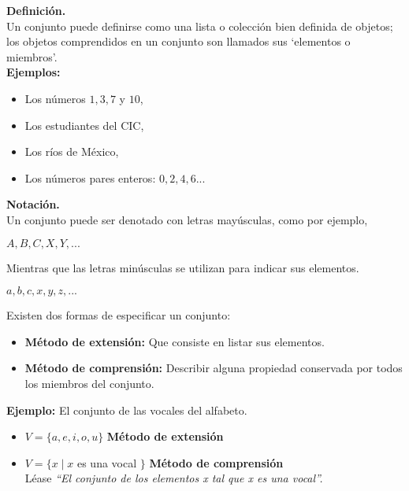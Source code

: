 \noindent \textbf{Definici\'on.} \\
    Un conjunto puede definirse como una lista o colección bien definida de objetos; los objetos comprendidos en un conjunto son llamados sus ‘elementos o miembros’. \\

\noindent    \textbf{Ejemplos:}
    \begin{itemize}
        \item Los n\'umeros $1, 3, 7$ y $10$,
        \item Los estudiantes del CIC, 
        \item Los r\'ios de M\'exico,
        \item Los n\'umeros pares enteros: $0, 2, 4, 6...$
    \end{itemize}

\noindent    \textbf{Notaci\'on.} \\ 
\noindent     Un conjunto puede ser denotado con letras may\'usculas, como por ejemplo,
     \begin{center}
         $A, B, C, X, Y, ...$
     \end{center}
 
\noindent     Mientras que las letras min\'usculas se utilizan para indicar sus elementos.
     \begin{center}
         $a,b,c,x,y,z, ...$
     \end{center}

\noindent  Existen dos formas de especificar un conjunto: \\ 
    
    \begin{itemize}{}
        \item  \textbf{M\'etodo de extensi\'on:} Que consiste en listar sus elementos.
        \item \textbf{M\'etodo de comprensi\'on:} Describir alguna propiedad conservada por todos los miembros del conjunto.\\ 
    \end{itemize}

   
    \begin{center}
        \begin{tcolorbox}
        \textbf{Ejemplo: } El conjunto de las vocales del alfabeto.      \vspace{5px}
            \begin{itemize}
                \item $ V = \lbrace a, e, i, o, u \rbrace $ \hspace{2.35cm} \textbf{M\'etodo de extensi\'on } 
                \item $ V =\lbrace x \mid x $ es una vocal $\rbrace$  \hspace{1cm} \textbf{M\'etodo de comprensi\'on} \\ \vspace{2px}
                 Léase \textit{“El conjunto de los elementos x tal que x es una vocal”.}
            \end{itemize}
        \end{tcolorbox} 
    \end{center}